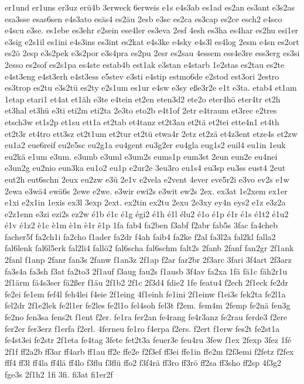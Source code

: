 {er1und
er1uns
er3uz
erü4b
3erweck
6erweis
e1s
e4s3ab
es1ad
es2an
es3ant
e3s2as
esa3sse
esas6sen
e4s3ato
esäs4
es2äu
2esb
e3sc
es2ca
es3cap
es2ce
esch2
e4sco
e4scu
e3se.
es1ebe
es3ehr
e2sein
ese4ler
es3eva
2esf
4esh
es3ha
es4har
es2hu
esi1er
e3sig
e2s1il
es1ini
e4s3ins
es3int
es2kat
e4s3ke
e4sky
e4s3l
es4log
2esm
e4sn
es2ort
es2ö
2esp
e3s2pek
e3s2por
e3s4pra
es2pu
2esr
es2sau
4essem
ess4e3re
ess3erg
es3si
2esso
es2sof
es2s1pa
es4ste
estab4b
est1ak
e3stan
e4starb
1e2stas
es2tau
es2te
e4st3eng
e4st3erh
e4st3ess
e5stev
e3sti
e4stip
estmo6de
e2stod
est3ori
2estro
es3trop
es2tu
e3s2tü
es2ty
e2s1um
es1ur
e4sw
e3sy
eße3r2e
e1t
e3ta.
etab4
et1am
1etap
etari1
et4at
et1äh
e3te
e4tein
et2en
eten3d2
ete2o
eter4hö
eter4tr
et2h
et3hal
et3hü
e3ti
eti2m
eti2ta
2e3to
eto2b
e4t1of
2etr
e4traum
et3rec
e2tres
etsch3w
et1s2p
et1su
ett1a
et2tab
et4tanz
et2t3au
et2tä
et2tei
ette4n1
et4th
et2t3r
et4tro
ett3sz
et2t1um
et2tur
et2tü
etwa4r
2etz
et2zä
et4z3ent
etze4s
et2zw
eu1a2
eue6reif
eu2e5sc
eu2g1a
eu4gent
eu3g2er
eu4gla
eug1s2
euil4
eu1in
1euk
eu2kä
e1um
e3um.
e3umb
e3uml
e3um2s
eums1p
eum3st
2eun
eun2e
eu4nei
e3un2g
eu2nio
eun3ka
eu1o2
eu1p
e2ur2e
3eu3ro
eu1s4
eu3sp
eu3ss
eust4
2eut
eut2h
eut6schn
2eux
eu2zw
e3ü
2e1v
e2vela
e2vent
4ever
eve5r2i
e3vo
ev2s
e1w
2ewa
e3wä4
ewä6s
2ewe
e2we.
e3wir
ewi2s
e3wit
ew2s
2ex.
ex3at
1e2xem
ex1er
e1xi
e2x1in
1exis
ex3l
3exp
2ext.
ex2tin
ex2tu
2exu
2e3xy
ey4n
eys2
e1z
e3z2a
e2z1enn
e3zi
ezi2s
ez2w
é1b
é1c
é1g
égi2
é1h
é1l
élu2
é1o
é1p
é1r
é1s
é1t2
é1u2
é1v
é1z2
è1c
è1m
è1n
è1r
ê1p
1fa
fab4
fa2ben
f3abf
f2abr
fab5s
3fac
fa4cheb
facher5f
fa2ch1i
fa2cho
f1ader
fa2dr
f4ah
faib4
fa2ke
f2al
fa3l2a
fal2kl
falla2
fal6lenk
fal6l5erk
fal2li4
fallö2
fal6scha
fal6schm
falt2s
2fanb
2fanf
fan2gr
2f1ank
2fanl
f1anp
2fanr
fan3s
2fanw
f1an3z
2f1ap
f2ar
far2br
2f3arc
3fari
3f4art
2f3arz
fa3s4a
fa3sh
f3at
fa2to3
2f1auf
f3aug
fau2s
f1ausb
3f4av
fa2xa
1fä
fä1c
fäh2r1u
2f1ärm
fä4s3ser
fä2ßer
f1äu
2f1b2
2f1c
2f3d4
fdie2
1fe
featu4
f2ech
2f1eck
fe2dr
fe2ei
fe1em
fef4l
feh4lei
f4eie
2f1eing
4f1einh
fe1ini
2f1einw
f1ei3s
fek2ta
fe2l1a
fel2dr
2f1e2lek
fe2l1er
fe2les
fe2l1o
fel4soh
fel3t
f2em.
fem4m
2femp
fe2nä
fen3g
fe2no
fen3sa
fens2t
f1ent
f2er.
fe1ra
fer2an
fe4rang
fe4r3anz
fe2rau
ferde3
f2ere
fer2er
fer3erz
f1erfa
f2erl.
4ferneu
fe1ro
f4erpa
f2ers.
f2ert
f1erw
fes2t
fe2st1a
fe4st3ei
fe2str
2f1eta
fe4tag
3fete
fet2t3a
feuer3e
feu4ru
3few
f1ex
2fexp
3fez
1fé
2f1f
ff2a2b
ff3ar
ff4arb
ff1au
ff2e
ffe2e
f2f3ef
ff3ei
ffe1in
ffe2m
f2f3emi
f2fetz
f2fex
fff4
ff3l
ff4la
ff4lä
ff4lo
f3flu
f3flü
ffo2
f3f4rä
ff3ro
ff3rö
ff2sa
ff3sho
ff2sp
4f3g2
fge3s
2f1h2
1fi
3fi.
fi3at
fi1er2f
}
